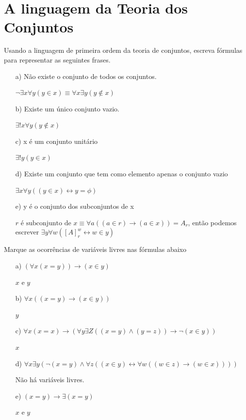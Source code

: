 \chapter{A linguagem da Teoria dos Conjuntos}

\begin{exercicio}
	Usando a linguagem de primeira ordem da teoria de conjuntos, escreva fórmulas para representar as seguintes frases.
\end{exercicio}

\begin{solucao}
\begin{enumerate}
	\item[a)] Não existe o conjunto de todos os conjuntos.
    \item[] $\neg \exists x \forall y (y \in x) \equiv \forall x \exists y (y \notin x)$
	\item[b)] Existe um único conjunto vazio.
    \item[] $\exists ! x \forall y (y \notin x)$
	\item[c)] x é um conjunto unitário
    \item[] $\exists ! y (y \in x)$
	\item[d)] Existe um conjunto que tem como elemento apenas o conjunto vazio
    \item[] $\exists x \forall y ((y \in x) \leftrightarrow y = \phi)$
	\item[e)] y é o conjunto dos subconjuntos de x 
    \item[] $r \text{ é subconjunto de } x \equiv \forall a ((a \in r) \rightarrow (a \in x)) = A_r$, então podemos escrever $\exists y \forall w ([A]_r^w \leftrightarrow w \in y)$
    
\end{enumerate}

\end{solucao}

\begin{exercicio}
	Marque as ocorrências de variáveis livres nas fórmulas abaixo
\end{exercicio}

\begin{enumerate}
	\item[a)] $(\forall x (x=y)) \rightarrow (x \in y ) $
    \item[] $x$ e $y$
	\item[b)] $ \forall x ((x=y) \rightarrow (x \in y))$
    \item[] $y$
	\item[c)] $\forall x(x=x) \rightarrow (\forall y \exists Z ((x=y) \land (y=z)) \rightarrow \neg(x\in y))$
    \item[] $x$
	\item[d)] $ \forall x \exists y(\neg(x=y) \land \forall z ((x \in y) \leftrightarrow \forall w ((w \in z ) \rightarrow (w \in x )))) $
    \item[] Não há variáveis livres.
	\item[e)] $(x=y)\rightarrow \exists (x=y) $
    \item[] $x$ e $y$
\end{enumerate}

